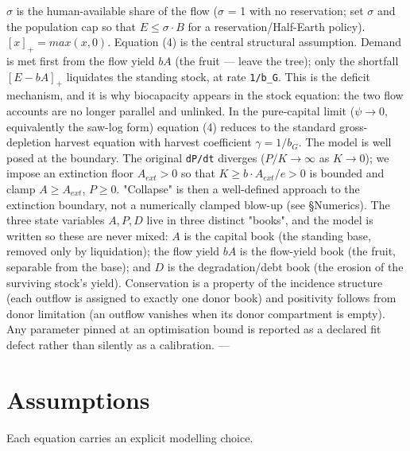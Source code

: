 \documentclass[11pt]{article}
\begin{document}
$\sigma{}$ is the human-available share of the flow (\ensuremath{\sigma{}} = 1 with no reservation; set \ensuremath{\sigma{}} and the population cap so that $E \leq{} \sigma{}\cdot{}B$ for a reservation/Half-Earth policy). $[x]_{+} = max(x, 0)$. Equation (4) is the central structural assumption. Demand is met first from the flow yield $bA$ (the fruit — leave the tree); only the shortfall $[E - bA]_{+}$ liquidates the standing stock, at rate \texttt{1/b\_G}. This is the deficit mechanism, and it is why biocapacity appears in the stock equation: the two flow accounts are no longer parallel and unlinked. In the pure-capital limit ($\psi{} \to{} 0$, equivalently the saw-log form) equation (4) reduces to the standard gross-depletion harvest equation with harvest coefficient $\gamma{} = 1/b_{G}$. The model is well posed at the boundary. The original \texttt{dP/dt} diverges ($P/K \to{} \infty{}$ as $K \to{} 0$); we impose an extinction floor $A_{ext} > 0$ so that $K \geq{} b\cdot{}A_{ext}/e > 0$ is bounded and clamp $A \geq{} A_{ext}$, $P \geq{} 0$. "Collapse" is then a well-defined approach to the extinction boundary, not a numerically clamped blow-up (see §Numerics). The three state variables $A, P, D$ live in three distinct "books", and the model is written so these are never mixed: $A$ is the capital book (the standing base, removed only by liquidation); the flow yield $bA$ is the flow-yield book (the fruit, separable from the base); and $D$ is the degradation/debt book (the erosion of the surviving stock's yield). Conservation is a property of the incidence structure (each outflow is assigned to exactly one donor book) and positivity follows from donor limitation (an outflow vanishes when its donor compartment is empty). Any parameter pinned at an optimisation bound is reported as a declared fit defect rather than silently as a calibration. ---

\section{Assumptions}

Each equation carries an explicit modelling choice.
\end{document}
